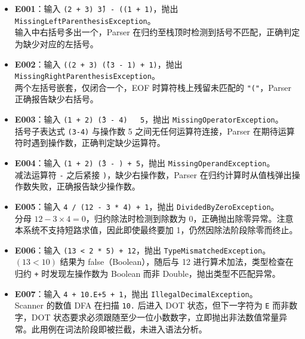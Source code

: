 \documentclass[a4paper]{article}
\begin{document}
\begin{itemize}
    \item \textbf{E001}：输入 \texttt{(2 + 3) \^ 3) - ((1 + 1)}，抛出 \texttt{MissingLeftParenthesisException}。\\
    输入中右括号多出一个，Parser 在归约至栈顶时检测到括号不匹配，正确判定为缺少对应的左括号。
    
    \item \textbf{E002}：输入 \texttt{((2 + 3) \^ ((3 - 1) + 1)}，抛出 \texttt{MissingRightParenthesisException}。\\
    两个左括号嵌套，仅闭合一个，EOF 时算符栈上残留未匹配的 \texttt{"("}，Parser 正确报告缺少右括号。
    
    \item \textbf{E003}：输入 \texttt{(1 + 2) \^ (3 - 4)~~~5}，抛出 \texttt{MissingOperatorException}。\\
    括号子表达式 \texttt{(3-4)} 与操作数 5 之间无任何运算符连接，Parser 在期待运算符时遇到操作数，正确判定缺少运算符。
    
    \item \textbf{E004}：输入 \texttt{(1 + 2) \^ (3 -~) + 5}，抛出 \texttt{MissingOperandException}。\\
    减法运算符 \texttt{-} 之后紧接 \texttt{)}，缺少右操作数，Parser 在归约计算时从值栈弹出操作数失败，正确报告缺少操作数。
    
    \item \textbf{E005}：输入 \texttt{4 / (12 - 3 * 4) + 1}，抛出 \texttt{DividedByZeroException}。\\
    分母 $12-3\times4 = 0$，归约除法时检测到除数为 0，正确抛出除零异常。注意本系统不支持短路求值，因此即使最终要加 1，仍然因除法阶段除零而终止。
    
    \item \textbf{E006}：输入 \texttt{(13 < 2 * 5) + 12}，抛出 \texttt{TypeMismatchedException}。\\
    $(13 < 10)$ 结果为 false（Boolean），随后与 12 进行算术加法，类型检查在归约 \texttt{+} 时发现左操作数为 Boolean 而非 Double，抛出类型不匹配异常。
    
    \item \textbf{E007}：输入 \texttt{4 + 10.E+5 + 1}，抛出 \texttt{IllegalDecimalException}。\\
    Scanner 的数值 DFA 在扫描 \texttt{10.} 后进入 DOT 状态，但下一字符为 \texttt{E} 而非数字，DOT 状态要求必须跟随至少一位小数数字，立即抛出非法数值常量异常。此用例在词法阶段即被拦截，未进入语法分析。
    

\end{itemize}
\end{document}
